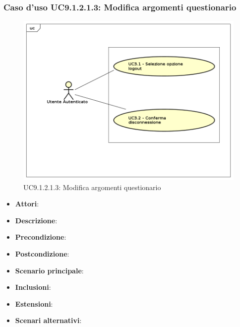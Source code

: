 					\subsubsection{Caso d'uso UC9.1.2.1.3: Modifica argomenti questionario}
					\label{UC9.1.2.1.3}
					\begin{figure}[h]
						\centering
					\includegraphics[scale=0.7,keepaspectratio]{UML/UC9.png}
						\caption{UC9.1.2.1.3: Modifica argomenti questionario}
					\end{figure}
					\FloatBarrier
					\begin{itemize}
						\item \textbf{Attori}: 
						\item \textbf{Descrizione}: 
						\item \textbf{Precondizione}: 
						\item \textbf{Postcondizione}: 
						\item \textbf{Scenario principale}:
						\item \textbf{Inclusioni}:
						\item \textbf{Estensioni}:
						\item \textbf{Scenari alternativi}:
					\end{itemize}
					
